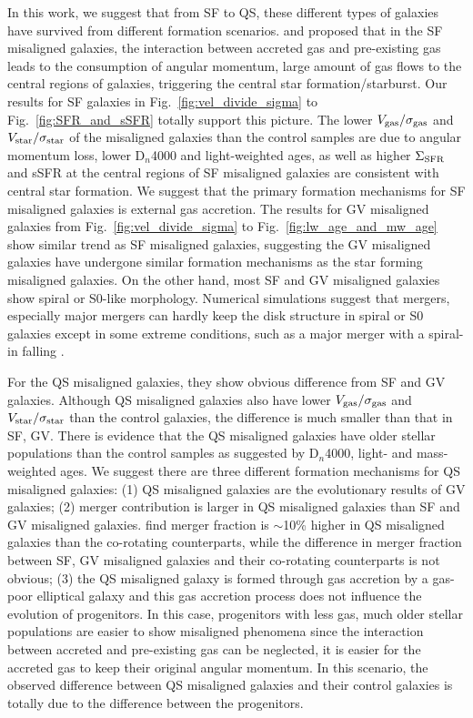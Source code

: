 In this work, we suggest that from SF to QS, these different types of galaxies have survived from different formation scenarios. \citet{chen_growth_2016} and \citet{jin_sdss-iv_2016} proposed that in the SF misaligned galaxies, the interaction between accreted gas and pre-existing gas leads to the consumption of angular momentum, large amount of gas flows to the central regions of galaxies, triggering the central star formation/starburst. Our results for SF galaxies in Fig.~\ref{fig:vel_divide_sigma} to Fig.~\ref{fig:SFR_and_sSFR} totally support this picture. The lower $V_{\rm gas}/{\sigma}_{\rm gas}$ and $V_{\rm star}/{\sigma}_{\rm star}$ of the misaligned galaxies than the control samples are due to angular momentum loss, lower D$_n$4000 and light-weighted ages, as well as higher $\Sigma_{\rm SFR}$ and sSFR at the central regions of SF misaligned galaxies are consistent with central star formation. We suggest that the primary formation mechanisms for SF misaligned galaxies is external gas accretion. The results for GV misaligned galaxies from Fig.~\ref{fig:vel_divide_sigma} to Fig.~\ref{fig:lw_age_and_mw_age} show similar trend as SF misaligned galaxies, suggesting the GV misaligned galaxies have undergone similar formation mechanisms as the star forming misaligned galaxies. On the other hand, most SF and GV misaligned galaxies show spiral or S0-like morphology. Numerical simulations suggest that mergers, especially major mergers can hardly keep the disk structure in spiral or S0 galaxies \citep{1992ApJ...393..484B} except in some extreme conditions, such as a major merger with a spiral-in falling \citep{zeng_formation_2021}.

For the QS misaligned galaxies, they show obvious difference from SF and GV galaxies. Although QS misaligned galaxies also have lower $V_{\rm gas}/{\sigma}_{\rm gas}$ and $V_{\rm star}/{\sigma}_{\rm star}$ than the control galaxies, the difference is much smaller than that in SF, GV. There is evidence that the QS misaligned galaxies have older stellar populations than the control samples as suggested by D$_n$4000, light- and mass-weighted ages. We suggest there are three different formation mechanisms for QS misaligned galaxies: (1) QS misaligned galaxies are the evolutionary results of GV galaxies; (2) merger contribution is larger in QS misaligned galaxies than SF and GV misaligned galaxies. \citet{li_impact_2020} find merger fraction is $\sim$10\% higher in QS misaligned galaxies than the co-rotating counterparts, while the difference in merger fraction between SF, GV misaligned galaxies and their co-rotating counterparts is not obvious; (3) the QS misaligned galaxy is formed through gas accretion by a gas-poor elliptical galaxy and this gas accretion process does not influence the evolution of progenitors. In this case, progenitors with less gas, much older stellar populations are easier to show misaligned phenomena since the interaction between accreted and pre-existing gas can be neglected, it is easier for the accreted gas to keep their original angular momentum. In this scenario, the observed difference between QS misaligned galaxies and their control galaxies is totally due to the difference between the progenitors.

